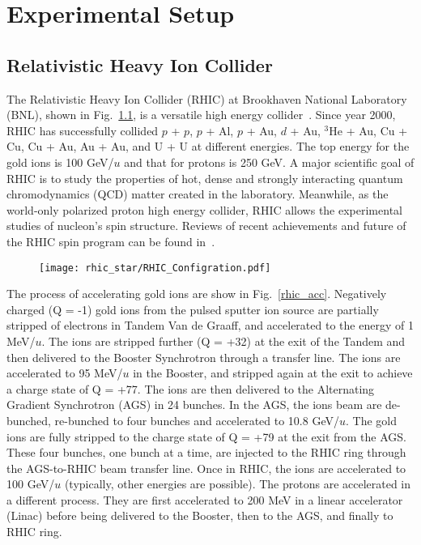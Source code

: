 \chapter{Experimental Setup}

\section{Relativistic Heavy Ion Collider}
The Relativistic Heavy Ion Collider (RHIC) at Brookhaven National Laboratory (BNL), shown in Fig.~\ref{rhic_config}, is a versatile high energy collider~\cite{RHIC_Overview}. Since year 2000, RHIC has successfully collided $p$ + $p$, $p$ + Al, $p$ + Au, $d$ + Au, $^3$He + Au, Cu + Cu, Cu + Au, Au + Au, and U + U at different energies. The top  energy for the gold ions is 100 GeV/$u$ and that for protons is 250 GeV. A major scientific goal of  RHIC is to study the properties of hot, dense and strongly interacting quantum chromodynamics (QCD) matter created in the laboratory. Meanwhile, as the world-only polarized proton high energy collider, RHIC allows the experimental studies of nucleon's spin structure. Reviews of recent achievements and future of the RHIC spin program can be found in~\cite{RHIC_Spin}.

\begin{figure}[htbp]
\centering
\texttt{[image: rhic\_star/RHIC\_Configration.pdf]}
 \label{rhic_config}
\end{figure}

The process of accelerating gold ions are show in Fig.~\ref{rhic_acc}. Negatively charged (Q = -1) gold ions from the pulsed sputter ion source are partially stripped of electrons in Tandem Van de Graaff, and accelerated to the energy of 1 MeV/$u$. The ions are stripped further (Q = +32) at the exit of the Tandem and then delivered to the Booster Synchrotron through a transfer line. The ions are accelerated to 95 MeV/$u$ in the Booster, and stripped again at the exit to achieve a charge state of Q = +77. The ions are then delivered to the Alternating Gradient Synchrotron (AGS) in 24 bunches. In the AGS, the ions beam are de-bunched, re-bunched to four bunches and accelerated to 10.8 GeV/$u$. The gold ions are fully stripped to the charge state of Q = +79 at the exit from the AGS. These four bunches, one bunch at a time, are injected to the RHIC ring through the AGS-to-RHIC beam transfer line. Once in RHIC, the ions are accelerated to 100 GeV/$u$ (typically, other energies are possible). The protons are accelerated in a different process. They are first accelerated to 200 MeV in a linear accelerator (Linac) before being delivered to the Booster, then to the AGS, and finally to RHIC ring.

